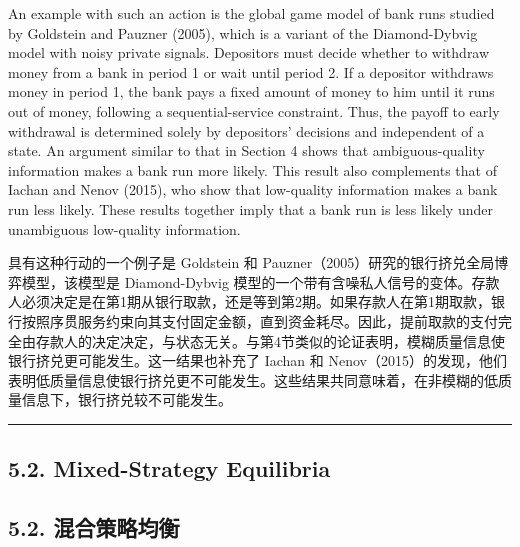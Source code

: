 \documentclass[12pt,a4paper]{article}
\newenvironment{original}
  {\par\medskip\noindent\color{black}\ignorespaces}
  {\par\medskip}
\newenvironment{translation}
  {\par\noindent\color{darkblue}\ignorespaces}
  {\par\medskip\noindent\hrule\par\medskip}
\theoremstyle{definition}
\theoremstyle{remark}
\begin{document}
\begin{original}
An example with such an action is the global game model of bank runs studied by Goldstein and Pauzner (2005), which is a variant of the Diamond-Dybvig model with noisy private signals. Depositors must decide whether to withdraw money from a bank in period 1 or wait until period 2. If a depositor withdraws money in period 1, the bank pays a fixed amount of money to him until it runs out of money, following a sequential-service constraint. Thus, the payoff to early withdrawal is determined solely by depositors' decisions and independent of a state. An argument similar to that in Section 4 shows that ambiguous-quality information makes a bank run more likely. This result also complements that of Iachan and Nenov (2015), who show that low-quality information makes a bank run less likely. These results together imply that a bank run is less likely under unambiguous low-quality information.
\end{original}
\begin{translation}
具有这种行动的一个例子是 Goldstein 和 Pauzner（2005）研究的银行挤兑全局博弈模型，该模型是 Diamond-Dybvig 模型的一个带有含噪私人信号的变体。存款人必须决定是在第1期从银行取款，还是等到第2期。如果存款人在第1期取款，银行按照序贯服务约束向其支付固定金额，直到资金耗尽。因此，提前取款的支付完全由存款人的决定决定，与状态无关。与第4节类似的论证表明，模糊质量信息使银行挤兑更可能发生。这一结果也补充了 Iachan 和 Nenov（2015）的发现，他们表明低质量信息使银行挤兑更不可能发生。这些结果共同意味着，在非模糊的低质量信息下，银行挤兑较不可能发生。
\end{translation}

\subsection{5.2. Mixed-Strategy Equilibria}
\subsection*{\color{darkblue}5.2. 混合策略均衡}
\end{document}
